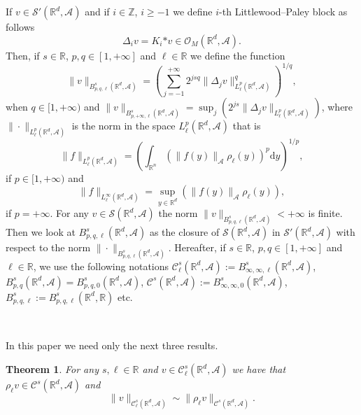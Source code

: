 \documentclass{article}
\newcommand{\assign}{:=}
\newcommand{\asterisk}{\mathord{*}}
\newcommand{\mathd}{\mathrm{d}}
\newtheorem{theorem}{Theorem}
\begin{document}
If $v \in \mathcal{S}' (\mathbb{R}^d, \mathcal{A})$ and if $i \in
\mathbb{Z}$, $i \geqslant - 1$ we define $i$-th Littlewood--Paley block as
follows
\[ \Delta_i v = K_i \asterisk v \in \mathcal{O}_M (\mathbb{R}^d, \mathcal{A})
   . \]
Then, if $s \in \mathbb{R}$, $p, q \in [1, + \infty]$ and $\ell \in
\mathbb{R}$ we define the function
\[ \| v \|_{B^s_{p, q, \ell} (\mathbb{R}^d, \mathcal{A})} = \left( \sum_{j = -
   1}^{+ \infty} 2^{j s q} \| \Delta_j v \|_{L^p_{\ell} (\mathbb{R}^d,
   \mathcal{A})}^q \right)^{1 / q}, \]
when $q \in [1, + \infty)$ and $\| v \|_{B^s_{p, + \infty, \ell}
(\mathbb{R}^d, \mathcal{A})} = \sup_j (2^{j s} \| \Delta_j v \|_{L^p_{\ell}
(\mathbb{R}^d, \mathcal{A})})$, where $\| \cdot \|_{L^p_{\ell} (\mathbb{R}^d,
\mathcal{A})}$ is the norm in the space $L_{\ell}^p (\mathbb{R}^d,
\mathcal{A})$ that is
\[ \| f \|_{L^p_{\ell} (\mathbb{R}^d, \mathcal{A})} = \left(
   \int_{\mathbb{R}^n} (\| f (y) \|_{\mathcal{A}} \rho_{\ell} (y))^p \mathd y
   \right)^{1 / p}, \]
if $p \in [1, + \infty)$ and
\[ \| f \|_{L^{\infty}_{\ell} (\mathbb{R}^d, \mathcal{A})} = \sup_{y \in
   \mathbb{R}^d} (\| f (y) \|_{\mathcal{A}} \rho_{\ell} (y)), \]
if $p = + \infty$. For any $v \in \mathcal{S} (\mathbb{R}^d, \mathcal{A})$ the
norm $\| v \|_{B^s_{p, q, \ell} (\mathbb{R}^d, \mathcal{A})} < + \infty$ is
finite. Then we look at $B^s_{p, q, \ell} (\mathbb{R}^d, \mathcal{A})$ as the
closure of $\mathcal{S} (\mathbb{R}^d, \mathcal{A})$ in $\mathcal{S}'
(\mathbb{R}^d, \mathcal{A})$ with respect to the norm $\| \cdot \|_{B^s_{p, q,
\ell} (\mathbb{R}^d, \mathcal{A})}$. Hereafter, if $s \in \mathbb{R}$, $p, q
\in [1, + \infty]$ and $\ell \in \mathbb{R}$, we use the following notations
$\mathcal{C}^s_{\ell} (\mathbb{R}^d, \mathcal{A}) \assign B^s_{\infty, \infty,
\ell} (\mathbb{R}^d, \mathcal{A})$, $B^s_{p, q} (\mathbb{R}^d, \mathcal{A}) =
B^s_{p, q, 0} (\mathbb{R}^d, \mathcal{A})$, $\mathcal{C}^s (\mathbb{R}^d,
\mathcal{A}) \assign B^s_{\infty, \infty, 0} (\mathbb{R}^d, \mathcal{A})$,
$B^s_{p, q, \ell} \assign B^s_{p, q, \ell} (\mathbb{R}^d, \mathbb{R})$ etc.

\

In this paper we need only the next three results.

\begin{theorem}
  \label{theorem_weight}For any $s, \ell \in \mathbb{R}$ and $v \in
  \mathcal{C}^s_{\ell} (\mathbb{R}^d, \mathcal{A})$ we have that $\rho_{\ell}
  v \in \mathcal{C}^s (\mathbb{R}^d, \mathcal{A})$ and
  \[ \| v \|_{\mathcal{C}^s_{\ell} (\mathbb{R}^d, \mathcal{A})} \sim \|
     \rho_{\ell} v \|_{\mathcal{C}^s (\mathbb{R}^d, \mathcal{A})} . \]
\end{theorem}
\end{document}
